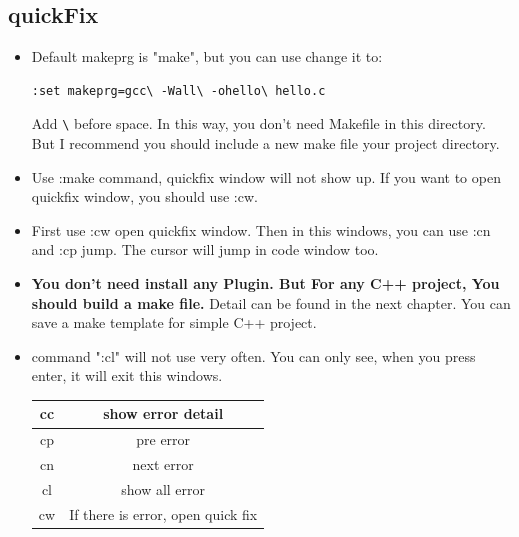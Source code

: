 \documentclass[a4paper,12pt,twoside]{book}
\begin{document}
\subsection{quickFix}
\begin{itemize}
\item Default makeprg is "make", but you can use change it to: 
\begin{verbatim}
:set makeprg=gcc\ -Wall\ -ohello\ hello.c 
\end{verbatim}
Add \verb=\= before space. In this way, you don't need Makefile in this directory. But I recommend you should include a new make file your project directory.

\item Use :make command, quickfix window will not show up. If you want to open quickfix window, you should use :cw. 

\item First use :cw open quickfix window. Then in this windows, you can use :cn and :cp jump. The cursor will jump in code window  too. 

\item \textbf{You don't need install any Plugin. But For any C++ project, You should build a make file.} Detail can be found in the next chapter.  You can save a make template for simple C++ project. 

\item command ":cl" will not use very often. You can only see, when you press enter, it will exit this windows. 

\begin{tabular}{c|c}
\hline
cc  &    show error detail \\
\hline
cp  &     pre error \\ 
\hline
cn &   next error\\ 
\hline
cl &     show all error\\
\hline
cw &    If there is error, open quick fix \\ 
\end{tabular}
\end{itemize}
\end{document}
